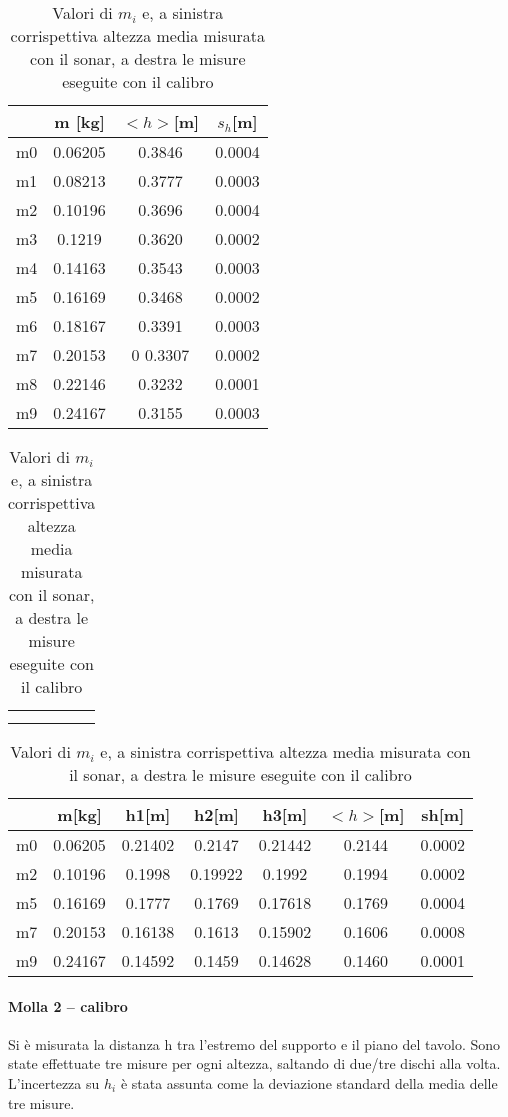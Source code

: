 \documentclass{article}
\begin{document}
\begin{table}[h]
    \begin{tabular}{|c|c|c|c|}
    \hline
         	&m [kg]	&	$<h>$[m] &$ s_h$[m] \\
          \hline
m0	& 0.06205 & 0.3846	& 0.0004 \\ 
m1	& 0.08213  &	0.3777 &	0.0003 \\ 
m2	& 0.10196&0.3696 &	0.0004\\
m3	& 0.1219 	&0.3620	&0.0002 \\
m4	&0.14163		&0.3543	&0.0003 \\
m5	&0.16169&	0.3468	&0.0002 \\
m6	&0.18167&0.3391 &	0.0003\\
m7	&0.20153 &0	0.3307 &	0.0002 \\
m8	&0.22146 &0.3232	&0.0001 \\
m9	&0.24167 &0.3155 &	0.0003 \\
\hline
    \end{tabular}
    \begin{tabular}{c|c}
         &  \\
         & 
    \end{tabular}
    \begin{tabular}{|c|c|c|c|c|c|c|}
    \hline
         	& m[kg]	&	h1[m] &	h2[m] &	h3[m]	& $<h> $[m]	& sh[m]\\
          \hline

m0	&0.06205 &		0.21402 &	0.2147	&0.21442 &	0.2144 &	0.0002 \\
m2	&0.10196 &	0.1998&	0.19922&	0.1992&	0.1994&	0.0002\\
m5	&0.16169	&0.1777&	0.1769	&0.17618&	0.1769&	0.0004\\
m7&	0.20153&0.16138&	0.1613	&0.15902	&0.1606	&0.0008\\
m9	&0.24167 &		0.14592 &	0.1459 &	0.14628	&0.1460 &	0.0001\\
\hline
    \end{tabular}
    \caption{Valori di $m_i$ e, a sinistra corrispettiva altezza media misurata con il sonar, a destra le misure eseguite con il calibro}
    \label{tab:my_label}
\end{table}


\paragraph{Molla 2 – calibro }
Si è misurata la distanza h tra l'estremo del supporto e il piano del tavolo. Sono state effettuate tre misure per ogni altezza, saltando di due/tre dischi alla volta. L'incertezza su $h_i$ è stata assunta come la deviazione standard della media  delle tre misure. \newline
\end{document}
